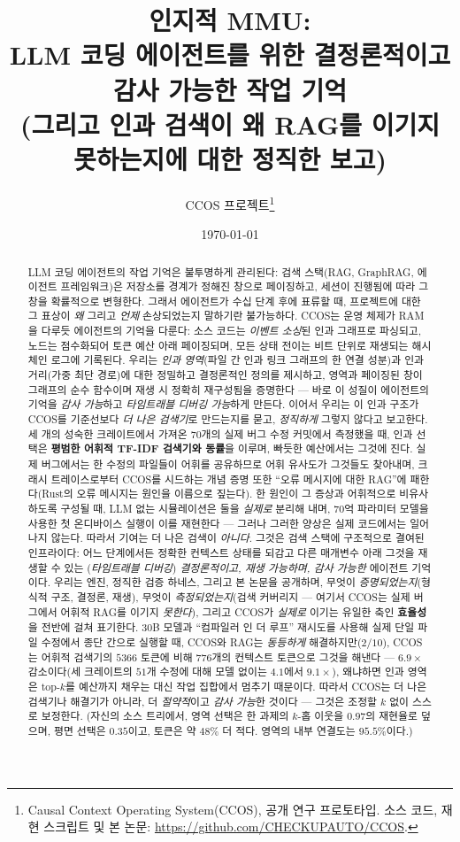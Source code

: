 \documentclass[11pt]{article}
\title{\textbf{인지적 MMU:\\ LLM 코딩 에이전트를 위한 결정론적이고 감사 가능한 작업 기억\\ \large (그리고 인과 검색이 왜 RAG를 이기지 못하는지에 대한 정직한 보고)}}
\author{CCOS 프로젝트\thanks{Causal Context Operating System(CCOS), 공개 연구
프로토타입. 소스 코드, 재현 스크립트 및 본 논문:
\url{https://github.com/CHECKUPAUTO/CCOS}.}}
\date{\today}
\begin{document}
\maketitle

\begin{abstract}
LLM 코딩 에이전트의 작업 기억은 불투명하게 관리된다: 검색 스택(RAG, GraphRAG, 에이전트
프레임워크)은 저장소를 경계가 정해진 창으로 페이징하고, 세션이 진행됨에 따라 그 창을 확률적으로
변형한다. 그래서 에이전트가 수십 단계 후에 표류할 때, 프로젝트에 대한 그 표상이 \emph{왜} 그리고
\emph{언제} 손상되었는지 말하기란 불가능하다. CCOS는 운영 체제가 RAM을 다루듯 에이전트의 기억을
다룬다: 소스 코드는 \emph{이벤트 소싱}된 인과 그래프로 파싱되고, 노드는 점수화되어 토큰 예산 아래
페이징되며, 모든 상태 전이는 비트 단위로 재생되는 해시 체인 로그에 기록된다. 우리는 \emph{인과
영역}(파일 간 인과 링크 그래프의 한 연결 성분)과 인과 거리(가중 최단 경로)에 대한 정밀하고 결정론적인
정의를 제시하고, 영역과 페이징된 창이 그래프의 순수 함수이며 재생 시 정확히 재구성됨을 증명한다 ---
바로 이 성질이 에이전트의 기억을 \emph{감사 가능}하고 \emph{타임트래블 디버깅 가능}하게 만든다.
이어서 우리는 이 인과 구조가 CCOS를 기준선보다 \emph{더 나은 검색기}로 만드는지를 묻고, \emph{정직하게}
그렇지 않다고 보고한다. 세 개의 성숙한 크레이트에서 가져온 $70$개의 실제 버그 수정 커밋에서 측정했을 때,
인과 선택은 \textbf{평범한 어휘적 TF-IDF 검색기와 동률}을 이루며, 빠듯한 예산에서는 그것에 진다.
실제 버그에서는 한 수정의 파일들이 어휘를 공유하므로 어휘 유사도가 그것들도 찾아내며, 크래시 트레이스로부터
CCOS를 시드하는 개념 증명 또한 ``오류 메시지에 대한 RAG''에 패한다(Rust의 오류 메시지는 원인을 이름으로
짚는다). 한 원인이 그 증상과 어휘적으로 비유사하도록 구성될 때, LLM 없는 시뮬레이션은 둘을 \emph{실제로}
분리해 내며, $70$억 파라미터 모델을 사용한 첫 온디바이스 실행이 이를 재현한다 --- 그러나 그러한 양상은
실제 코드에서는 일어나지 않는다. 따라서 기여는 더 나은 검색이 \emph{아니다}. 그것은 검색 스택에 구조적으로
결여된 인프라이다: 어느 단계에서든 정확한 컨텍스트 상태를 되감고 다른 매개변수 아래 그것을 재생할 수 있는
(\emph{타임트래블 디버깅}) \emph{결정론적이고, 재생 가능하며, 감사 가능한} 에이전트 기억이다. 우리는 엔진,
정직한 검증 하네스, 그리고 본 논문을 공개하며, 무엇이 \emph{증명되었는지}(형식적 구조, 결정론, 재생),
무엇이 \emph{측정되었는지}(검색 커버리지 --- 여기서 CCOS는 실제 버그에서 어휘적 RAG를 이기지 \emph{못한다}),
그리고 CCOS가 \emph{실제로} 이기는 유일한 축인 \textbf{효율성}을 전반에 걸쳐 표기한다. 30B 모델과
``컴파일러 인 더 루프'' 재시도를 사용해 실제 단일 파일 수정에서 종단 간으로 실행할 때, CCOS와 RAG는
\emph{동등하게} 해결하지만($2/10$), CCOS는 어휘적 검색기의 $5366$ 토큰에 비해 $776$개의 컨텍스트 토큰으로
그것을 해낸다 --- $6.9\times$ 감소이다(세 크레이트의 $51$개 수정에 대해 모델 없이는 $4.1$에서 $9.1\times$),
왜냐하면 인과 영역은 top-$k$를 예산까지 채우는 대신 작업 집합에서 멈추기 때문이다. 따라서 CCOS는 더 나은
검색기나 해결기가 아니라, 더 \emph{절약적}이고 \emph{감사 가능}한 것이다 --- 그것은 조정할 $k$ 없이 스스로
보정한다. (자신의 소스 트리에서, 영역 선택은 한 과제의 $k$-홉 이웃을 $0.97$의 재현율로 덮으며, 평면 선택은
$0.35$이고, 토큰은 약 $48\%$ 더 적다. 영역의 내부 연결도는 $95.5\%$이다.)
\end{abstract}
\end{document}
